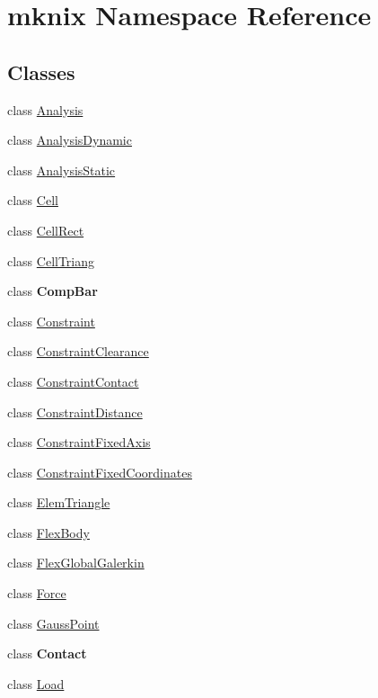 \hypertarget{namespacemknix}{
\section{mknix Namespace Reference}
\label{namespacemknix}
}


\subsection*{Classes}
\begin{CompactItemize}
\item 
class \hyperlink{classmknix_1_1Analysis}{Analysis}
\item 
class \hyperlink{classmknix_1_1AnalysisDynamic}{AnalysisDynamic}
\item 
class \hyperlink{classmknix_1_1AnalysisStatic}{AnalysisStatic}
\item 
class \hyperlink{classmknix_1_1Cell}{Cell}
\item 
class \hyperlink{classmknix_1_1CellRect}{CellRect}
\item 
class \hyperlink{classmknix_1_1CellTriang}{CellTriang}
\item 
class \textbf{CompBar}
\item 
class \hyperlink{classmknix_1_1Constraint}{Constraint}
\item 
class \hyperlink{classmknix_1_1ConstraintClearance}{ConstraintClearance}
\item 
class \hyperlink{classmknix_1_1ConstraintContact}{ConstraintContact}
\item 
class \hyperlink{classmknix_1_1ConstraintDistance}{ConstraintDistance}
\item 
class \hyperlink{classmknix_1_1ConstraintFixedAxis}{ConstraintFixedAxis}
\item 
class \hyperlink{classmknix_1_1ConstraintFixedCoordinates}{ConstraintFixedCoordinates}
\item 
class \hyperlink{classmknix_1_1ElemTriangle}{ElemTriangle}
\item 
class \hyperlink{classmknix_1_1FlexBody}{FlexBody}
\item 
class \hyperlink{classmknix_1_1FlexGlobalGalerkin}{FlexGlobalGalerkin}
\item 
class \hyperlink{classmknix_1_1Force}{Force}
\item 
class \hyperlink{classmknix_1_1GaussPoint}{GaussPoint}
\item 
class \textbf{Contact}
\item 
class \hyperlink{classmknix_1_1Load}{Load}

\end{CompactItemize}
